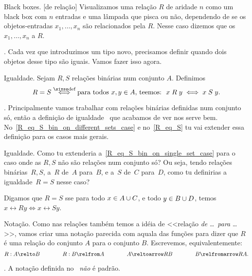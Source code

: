 \note Black boxes.
\label{blackbox_rel}%
[de relação]%
%
Visualizamos uma relação $R$ de aridade $n$ como um black box com $n$ entradas
e uma lâmpada que pisca ou não, dependendo de se os objetos-entradas
$x_1,\dotsc,x_n$ são relacionados pela $R$.
Nesse caso dizemos que os $x_1,\dotsc,x_n$  a $R$.

\blah.
Cada vez que introduzimos um tipo novo, precisamos definir quando dois objetos
desse tipo são iguais.  Vamos fazer isso agora.

 Igualdade.
\label{R_eq_S_bin_on_single_set_case}%
Sejam $R,S$ relações binárias num conjunto $A$.
Definimos
$$
R=S
\defiff
\text {para todos $x,y \in A$, teemos:\ \ $x \rel R y \iff x \rel S y$}.
$$

\blah.
Principalmente vamos trabalhar com relações binárias definidas num conjunto só,
então a definição de igualdade~ que
acabamos de ver nos serve bem.  No~\ref{R_eq_S_bin_on_different_sets_case}
e no~\ref{R_eq_S} tu vai extender essa definição para os casos mais gerais.

\exercise Igualdade.
\label{R_eq_S_bin_on_different_sets_case}%
Como tu extenderia a~\ref{R_eq_S_bin_on_single_set_case} para o caso onde as
$R,S$ não são relações num conjunto só?
Ou seja, tendo relações binárias~$R,S$, a~$R$ de~$A$ para~$B$, e a~$S$ de~$C$
para~$D$, como tu definirias a igualdade~$R=S$ nesse caso?

\solution
Digamos que $R=S$ sse para todo $x\in A\cup C$, e todo $y \in B\cup D$, temos $x \rel R y \iff x \rel S y$.

\endexercise

\note Notação.
\label{funlike_notation_for_rels}%
Como nas relações também temos a idéia de <<relação \emph{de} \dots\ \emph{para} \dots>>,
vamos criar uma notação parecida com aquala das funções para dizer que $R$ é uma relação do conjunto $A$ para o conjunto $B$.
Escrevemos, equivalentemente:
$$
R : A \relto B
\qqqquad
R : B \relfrom A
\qqqquad
A \reltoarrow R B
\qqqquad
B \relfromarrow R A.
$$

\beware.
A notação definida no~ \emph{não} é padrão.

\endsection

